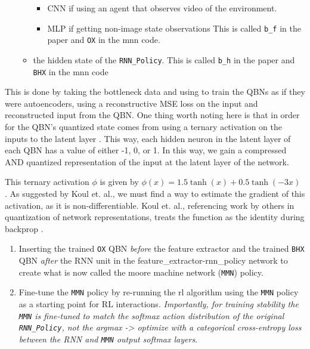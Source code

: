 \begin{enumerate}
\begin{itemize}
    \begin{itemize}
    \itemsep1pt\parskip0pt
    \item
      CNN if using an agent that observes video of the environment.
    \item
      MLP if getting non-image state observations This is called
      \texttt{b\_f} in the paper and \texttt{OX} in the mnn code.
    \end{itemize}
  \item
    the hidden state of the \texttt{RNN\_Policy}. This is called
    \texttt{b\_h} in the paper and \texttt{BHX} in the mnn code
  \end{itemize}
\end{enumerate}

    This is done by taking the bottleneck data and using to train the QBNs as if they were autoencoders, using a reconstructive MSE loss on the input and reconstructed input from the QBN. One thing worth noting here is that in order for the QBN's quantized state comes from using a ternary activation on the inputs to the latent layer \cite{Koul2019}. This way, each hidden neuron in the latent layer of each QBN has a value of either -1, 0, or 1. In this way, we gain a compressed AND quantized representation of the input at the latent layer of the network.

    This ternary activation $\phi$ is given by \(\phi(x)=1.5 \tanh (x)+0.5 \tanh (-3 x)\) \cite{Koul2019}. As suggested by Koul et. al., we must find a way to estimate the gradient of this activation, as it is non-differentiable. Koul et. al., referencing work by others in quantization of network representations, treats the function as the identity during backprop \cite{Koul2019}.

\begin{enumerate}
\def\labelenumi{\arabic{enumi}.}
\setcounter{enumi}{3}
\item
  Inserting the trained \texttt{OX} QBN \emph{before} the feature extractor
  and the trained \texttt{BHX} QBN \emph{after} the RNN unit in the
  feature\_extractor-rnn\_policy network to create what is now called
  the moore machine network (\texttt{MMN}) policy.
\item
  Fine-tune the \texttt{MMN} policy by re-running the rl algorithm using
  the \texttt{MMN} policy as a starting point for RL interactions.
  \emph{Importantly, for training stability the \texttt{MMN} is
  fine-tuned to match the softmax action distribution of the original
  \texttt{RNN\_Policy}, not the argmax -\textgreater{} optimize with a
  categorical cross-entropy loss between the RNN and \texttt{MMN} output
  softmax layers}.
\end{enumerate}


